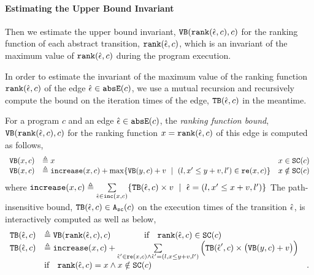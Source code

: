  \paragraph{Estimating the Upper Bound Invariant}
Then we estimate the upper bound invariant, ${\mathtt{VB}}(\mathtt{rank}(\hat{\mathtt{\epsilon}{}}, c), c)$ for the ranking function of each abstract transition, $\mathtt{rank}(\hat{\mathtt{\epsilon}{}}, c)$, which
is an invariant of the maximum value of $\mathtt{rank}(\hat{\mathtt{\epsilon}{}}, c)$ during the program execution.

In order to estimate the invariant of the maximum value of the ranking function $\mathtt{rank}(\hat{\mathtt{\epsilon}{}}, c)$
 of the edge $\hat{\mathtt{\epsilon}{}} \in \mathtt{abs}{\mathtt{E}}(c)$, we use a mutual recursion and recursively compute
 the bound on the iteration times of the edge, ${\mathtt{TB}}(\hat{\mathtt{\epsilon}{}}, c)$ in the meantime.

\begin{defn}
 \label{def:ranking_bound}
For a program $c$ and an edge $\hat{\mathtt{\epsilon}{}} \in \mathtt{abs}{\mathtt{E}}(c)$,
the \emph{ranking function bound}, 
${\mathtt{VB}}(\mathtt{rank}(\hat{\mathtt{\epsilon}{}}, c), c)$ for the ranking function $x = \mathtt{rank}(\hat{\mathtt{\epsilon}{}}, c)$
of this edge
is computed as follows,
{\small
 \[ 
\begin{array}{lll}
 \varinvar(x, c) & \triangleq x & x \in \scvar(c) \\
 \varinvar(x, c) & \triangleq \incrs(x, c) + \max\left\{\varinvar(y, c) + v ~\mid~ (l, x' \leq y + v, l') \in \reset(x, c) \right\} & x \notin \scvar(c)
\end{array}
\]
}
%
where $\mathtt{increase}(x, c) \triangleq \sum\limits_{\hat{\mathtt{\epsilon}{}} \in \mathtt{inc}(x, c)}\{{\mathtt{TB}}(\hat{\mathtt{\epsilon}{}}, c) \times v ~\mid~ \hat{\mathtt{\epsilon}{}} = (l, x' \leq x + v, l')\}$
The path-insensitive bound, ${\mathtt{TB}}(\hat{\mathtt{\epsilon}{}}, c) \in {\ensuremath{\mathtt{A_{sc}}}}(c)$ on the execution times of the transition $\hat{\mathtt{\epsilon}{}}$, is interactively computed as well as below,
{\small
\[ 
\begin{array}{lll}
 {\ensuremath{\mathtt{TB}}}(\hat{\mathtt{\epsilon}{}}, c) 
 & \triangleq {\ensuremath{\mathtt{VB}}}(\mathtt{rank}(\hat{\mathtt{\epsilon}{}}, c), c) \qquad \qquad \text{if} \quad \mathtt{rank}(\hat{\mathtt{\epsilon}{}}, c) \in \mathtt{SC}(c) & \\
 {\mathtt{TB}}(\hat{\mathtt{\epsilon}{}}, c) 
 & \triangleq \mathtt{increase}(x, c) 
 + 
 \sum\limits_{\hat{\mathtt{\epsilon}{}}' \in \mathtt{re}(x, c) \land \hat{\mathtt{\epsilon}{}}' = (l, x \leq y + v, l') }
 \Big( {\mathtt{TB}}(\hat{\mathtt{\epsilon}{}}', c) \times \big( {\mathtt{VB}}(y, c) + v \big) \Big)
 & \\
 & \text{if} \quad \mathtt{rank}(\hat{\mathtt{\epsilon}{}}, c) = x \land x \notin \mathtt{SC}(c) &.
\end{array}
 \]
}
\end{defn}
